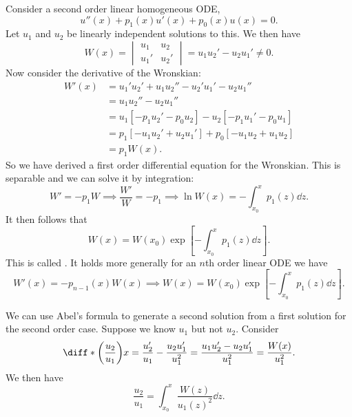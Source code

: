 \documentclass[fleqn]{NotesClass}
\begin{document}
    Consider a second order linear homogeneous ODE,
    \begin{equation}
        u''(x) + p_1(x)u'(x) + p_0(x)u(x) = 0.
    \end{equation}
    Let \(u_1\) and \(u_2\) be linearly independent solutions to this.
    We then have
    \begin{equation}
        W(x) = 
        \begin{vmatrix}
            u_1 & u_2\\
            u_1' & u_2'
        \end{vmatrix}
        = u_1u_2' - u_2u_1' \ne 0.
    \end{equation}
    Now consider the derivative of the Wronskian:
    \begin{align}
        W'(x) &= u_1'u_2' + u_1u_2'' - u_2'u_1' - u_2u_1''\\
        &= u_1u_2'' - u_2u_1''\\
        &= u_1[-p_1u_2' - p_0u_2] - u_2[-p_1u_1' - p_0u_1]\\
        &= p_1[-u_1u_2' + u_2u_1'] + p_0[-u_1u_2 + u_1u_2]\\
        &= p_1W(x).
    \end{align}
    So we have derived a first order differential equation for the Wronskian.
    This is separable and we can solve it by integration:
    \begin{equation}
        W' = -p_1W \implies \frac{W'}{W} = -p_1 \implies \ln W(x) = -\int_{x_0}^{x} p_1(z) \dd{z}.
    \end{equation}
    It then follows that
    \begin{equation}
        W(x) = W(x_0)\exp\left[ -\int_{x_0}^{x} p_1(z) \dd{z} \right].
    \end{equation}
    This is called .
    It holds more generally for an \(n\)th order linear ODE we have
    \begin{equation}
        W'(x) = -p_{n-1}(x)W(x) \implies W(x) = W(x_0)\exp\left[ -\int_{x_0}^{x} p_1(z) \dd{z} \right].
    \end{equation}
    
    We can use Abel's formula to generate a second solution from a first solution for the second order case.
    Suppose we know \(u_1\) but not \(u_2\).
    Consider
    \begin{equation}
        \diff*{\left( \frac{u_2}{u_1} \right)}{x} = \frac{u_2'}{u_1} - \frac{u_2u_1'}{u_1^2} = \frac{u_1u_2' - u_2u_1'}{u_1^2} = \frac{W(x)}{u_1^2}.
    \end{equation}
    We then have
    \begin{equation}
        \frac{u_2}{u_1} = \int_{x_0}^{x} \frac{W(z)}{u_1(z)^2} \dd{z}.
    \end{equation}
    
\end{document}

